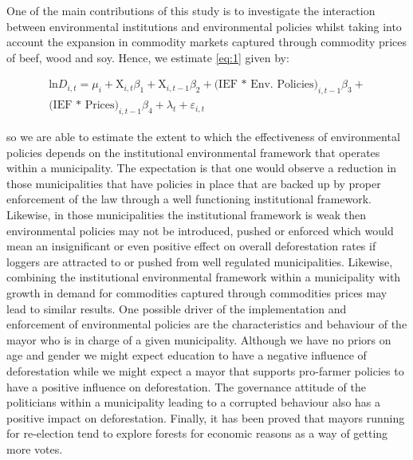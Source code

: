 



One of the main contributions of this study is to investigate the interaction between environmental institutions and environmental policies whilst taking into account the expansion in commodity markets captured through commodity prices of beef, wood and soy. Hence, we estimate \eqref{eq:1} given by:





\begin{equation}
\begin{gathered}
\text{ln}D_{i,t} = \mu_{i} + \text{X}_{i,t}\beta_{1} + \text{X}_{i,t-1}\beta_{2}  + \text{(IEF * Env. Policies)}_{i,t-1} \beta_{3} + \\ \text{(IEF * Prices)}_{i,t-1}  \beta_{4} + \lambda_{t} + \varepsilon_{i,t} \label{eq:2} 
\end{gathered}
\end{equation}



so we are able to estimate the extent to which the effectiveness of environmental policies depends on the institutional environmental framework that operates within a municipality. The expectation is that one would observe a reduction in those municipalities that have policies in place that are backed up by proper enforcement of the law through a well functioning institutional framework.  Likewise, in those municipalities the institutional framework is weak then environmental policies may not be introduced, pushed or enforced which would mean an insignificant or even positive effect on overall deforestation rates if loggers are attracted to or pushed from well regulated municipalities. Likewise, combining the institutional environmental framework within a municipality with growth in demand for commodities captured through commodities prices may lead to similar results. One possible driver of the implementation and enforcement of environmental policies are the characteristics and behaviour of the mayor who is in charge of a given municipality. Although we have no priors on age and gender we might expect education to have a negative influence of deforestation while we might expect a mayor that supports pro-farmer policies to have a positive influence on deforestation. The governance attitude of the politicians  within a municipality leading to a corrupted behaviour also has a positive impact on deforestation. Finally, it has been proved that mayors running for re-election tend to explore forests for economic reasons as a way of getting more votes.

